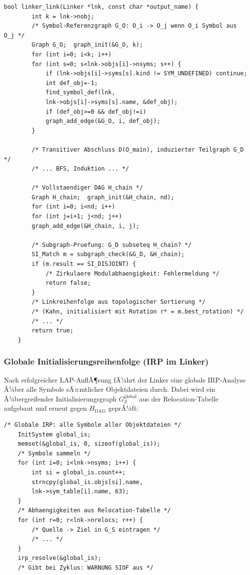 ﻿\documentclass[a4paper,12pt]{article}
\theoremstyle{definition}
\begin{document}
\begin{lstlisting}[style=cstyle, caption={LAP -- G\_O aufbauen und
		SI-PrÃ¼fung (linker.c)}, label=lst:lap-impl]
	bool linker_link(Linker *lnk, const char *output_name) {
		int k = lnk->nobj;
		/* Symbol-Referenzgraph G_O: O_i -> O_j wenn O_i Symbol aus O_j */
		Graph G_O;  graph_init(&G_O, k);
		for (int i=0; i<k; i++)
		for (int s=0; s<lnk->objs[i]->nsyms; s++) {
			if (lnk->objs[i]->syms[s].kind != SYM_UNDEFINED) continue;
			int def_obj=-1;
			find_symbol_def(lnk,
			lnk->objs[i]->syms[s].name, &def_obj);
			if (def_obj>=0 && def_obj!=i)
			graph_add_edge(&G_O, i, def_obj);
		}
		
		/* Transitiver Abschluss D(O_main), induzierter Teilgraph G_D */
		/* ... BFS, Induktion ... */
		
		/* Vollstaendiger DAG H_chain */
		Graph H_chain;  graph_init(&H_chain, nd);
		for (int i=0; i<nd; i++)
		for (int j=i+1; j<nd; j++)
		graph_add_edge(&H_chain, i, j);
		
		/* Subgraph-Pruefung: G_D subseteq H_chain? */
		SI_Match m = subgraph_check(&G_D, &H_chain);
		if (m.result == SI_DISJOINT) {
			/* Zirkulaere Modulabhaengigkeit: Fehlermeldung */
			return false;
		}
		/* Linkreihenfolge aus topologischer Sortierung */
		/* (Kahn, initialisiert mit Rotation r* = m.best_rotation) */
		/* ... */
		return true;
	}
\end{lstlisting}

\subsubsection{Globale Initialisierungsreihenfolge (IRP im Linker)}

Nach erfolgreicher LAP-AuflÃ¶sung fÃ¼hrt der Linker eine globale
IRP-Analyse Ã¼ber alle Symbole sÃ¤mtlicher Objektdateien durch. Dabei wird
ein Ã¼bergreifender Initialisierungsgraph $G_{\mathcal{S}}^{\text{global}}$
aus der Relocation-Tabelle aufgebaut und erneut gegen $H_{\text{DAG}}$
geprÃ¼ft:

\begin{lstlisting}[style=cstyle, caption={Globale IRP im Linker (linker.c)},
	label=lst:irp-linker]
	/* Globale IRP: alle Symbole aller Objektdateien */
	InitSystem global_is;
	memset(&global_is, 0, sizeof(global_is));
	/* Symbole sammeln */
	for (int i=0; i<lnk->nsyms; i++) {
		int si = global_is.count++;
		strncpy(global_is.objs[si].name,
		lnk->sym_table[i].name, 63);
	}
	/* Abhaengigkeiten aus Relocation-Tabelle */
	for (int r=0; r<lnk->nrelocs; r++) {
		/* Quelle -> Ziel in G_S eintragen */
		/* ... */
	}
	irp_resolve(&global_is);
	/* Gibt bei Zyklus: WARNUNG SIOF aus */
\end{lstlisting}
\end{document}

